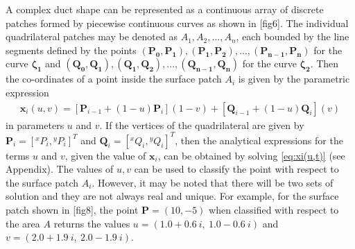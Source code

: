 \documentclass[12pt,a4]{article}
\begin{document}
A complex duct shape can be represented as a continuous array of discrete patches formed by piecewise continuous curves as shown in [fig6]. The individual quadrilateral patches may be denoted as $A_1,A_2,...,A_n$, each bounded by the line segments defined by the points $\mathbf{(P_0,P_1),(P_1,P_2),...,(P_{n-1},P_n)}$ for the curve $\mathbf{\zeta_1}$ and $\mathbf{(Q_0,Q_1),(Q_1,Q_2),...,(Q_{n-1},Q_n)}$ for the curve $\mathbf{\zeta_2}$. Then the co-ordinates of a point inside the surface patch $A_i$ is given by the parametric expression
\begin{align}
\label{eq:xi(u,t)}
\mathbf{x}_i(u,v)= \left[ \mathbf{P}_{i-1}+\left(1-{u} \right)\mathbf{P}_i  \right]\left(1-{v}\right) +\left[\mathbf{ Q}_{i-1}+\left(1-{u} \right)\mathbf{Q}_i  \right]\left({v}\right)
\end{align}
in parameters $u$ and $v$. If the vertices of the quadrilateral are given by $\mathbf{P}_{i}=\left[ {}^xP_{i},{}^yP_{i}\right]^T $ and $\mathbf{Q}_{i}=\left[ {}^xQ_{i},{}^yQ_{i}\right]^T $, then the analytical expressions for the terms $u$ and ${v}$, given the value of $\mathbf{x}_i$, can be obtained by solving \ref{eq:xi(u,t)} (see Appendix). The values of $u,v$ can be used to classify the point with respect to the surface patch $A_i$. However, it may be noted that there will be two sets of solution and they are not always real and unique. For example, for the surface patch shown in [fig8], the point $\mathbf{P} =\left(10,-5 \right)$ when classified with respect to the area $A$ returns the values $u=\left( 1.0 + 0.6~i,~1.0 - 0.6~i \right)$ and $v=\left(2.0 + 1.9~i,~2.0 - 1.9~i\right)$.
\end{document}
